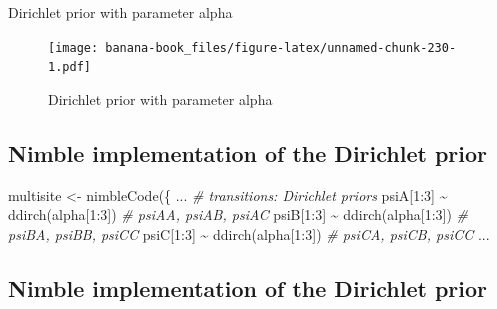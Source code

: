 \documentclass[
  12pt,
]{krantz}
\newenvironment{Shaded}{\begin{snugshade}}{\end{snugshade}}
\newcommand{\CommentTok}[1]{\textcolor[rgb]{0.56,0.35,0.01}{\textit{#1}}}
\newcommand{\DecValTok}[1]{\textcolor[rgb]{0.00,0.00,0.81}{#1}}
\newcommand{\FunctionTok}[1]{\textcolor[rgb]{0.00,0.00,0.00}{#1}}
\newcommand{\NormalTok}[1]{#1}
\newcommand{\OtherTok}[1]{\textcolor[rgb]{0.56,0.35,0.01}{#1}}
\newcommand{\SpecialCharTok}[1]{\textcolor[rgb]{0.00,0.00,0.00}{#1}}
\begin{document}
Dirichlet prior with parameter alpha

\begin{figure}
\centering
\texttt{[image: banana-book\_files/figure-latex/unnamed-chunk-230-1.pdf]}
\caption{\label{fig:unnamed-chunk-230}Dirichlet prior with parameter alpha}
\end{figure}

\hypertarget{nimble-implementation-of-the-dirichlet-prior}{%
\subsection{Nimble implementation of the Dirichlet prior}\label{nimble-implementation-of-the-dirichlet-prior}}

\begin{Shaded}
\begin{Highlighting}[]
\NormalTok{multisite }\OtherTok{\textless{}{-}} \FunctionTok{nimbleCode}\NormalTok{(\{}
\NormalTok{...}
  \CommentTok{\# transitions: Dirichlet priors}
\NormalTok{  psiA[}\DecValTok{1}\SpecialCharTok{:}\DecValTok{3}\NormalTok{] }\SpecialCharTok{\textasciitilde{}} \FunctionTok{ddirch}\NormalTok{(alpha[}\DecValTok{1}\SpecialCharTok{:}\DecValTok{3}\NormalTok{]) }\CommentTok{\# psiAA, psiAB, psiAC}
\NormalTok{  psiB[}\DecValTok{1}\SpecialCharTok{:}\DecValTok{3}\NormalTok{] }\SpecialCharTok{\textasciitilde{}} \FunctionTok{ddirch}\NormalTok{(alpha[}\DecValTok{1}\SpecialCharTok{:}\DecValTok{3}\NormalTok{]) }\CommentTok{\# psiBA, psiBB, psiCC}
\NormalTok{  psiC[}\DecValTok{1}\SpecialCharTok{:}\DecValTok{3}\NormalTok{] }\SpecialCharTok{\textasciitilde{}} \FunctionTok{ddirch}\NormalTok{(alpha[}\DecValTok{1}\SpecialCharTok{:}\DecValTok{3}\NormalTok{]) }\CommentTok{\# psiCA, psiCB, psiCC}
\NormalTok{...}
\end{Highlighting}
\end{Shaded}

\hypertarget{nimble-implementation-of-the-dirichlet-prior-1}{%
\subsection{Nimble implementation of the Dirichlet prior}\label{nimble-implementation-of-the-dirichlet-prior-1}}
\end{document}
